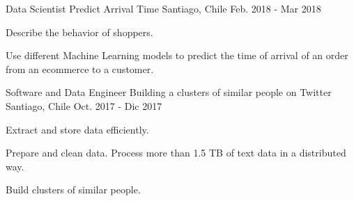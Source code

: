 \begin{cventries}
  \cventry
    {Data Scientist} %
    {Predict Arrival Time} %
    {Santiago, Chile} %
    {Feb. 2018 - Mar 2018} %
    {
      \begin{cvitems} %
        \item {Describe the behavior of shoppers.}
		\item {Use different Machine Learning models to predict the time of arrival of an order from an ecommerce to a customer.}        
      \end{cvitems}
    }
  \cventry
    {Software and Data Engineer} %
    {Building a clusters of similar people on Twitter} %
    {Santiago, Chile} %
    {Oct. 2017 - Dic 2017} %
    {
      \begin{cvitems} %
		\item {Extract and store data efficiently.}        
        \item {Prepare and clean data. Process more than 1.5 TB of text data in a distributed way.}
        \item {Build clusters of similar people.}
      \end{cvitems}
    }
\end{cventries}
